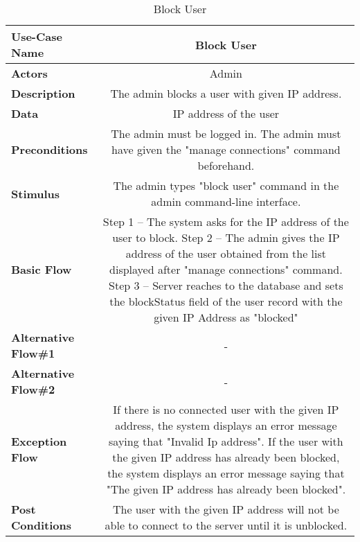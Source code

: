 \begin{table}[H]
     \centering
     \begin{tabular}{|l|C|}
         \hline
          \textbf{Use-Case Name} & Block User \\
         \hline
          \textbf{Actors} & Admin \\ 
         \hline
          \textbf{Description} & The admin blocks a user with given IP address. \\ 
         \hline
          \textbf{Data} & IP address of the user\\ 
         \hline
          \textbf{Preconditions} & 
          The admin must be logged in. \newline
          The admin must have given the "manage connections" command beforehand.\\
         \hline
          \textbf{Stimulus} & The admin types "block user" command in the admin command-line interface.\\ 
         \hline
          \textbf{Basic Flow} & 
          Step 1 -- The system asks for the IP address of the user to block. \newline
          Step 2 -- The admin gives the IP address of the user obtained from the list displayed after "manage connections" command. \newline
          Step 3 -- Server reaches to the database and sets the blockStatus field of the user record with the given IP Address as "blocked" \\
         \hline
          \textbf{Alternative Flow\#1} & -\\
         \hline
          \textbf{Alternative Flow\#2} & - \\
         \hline
          \textbf{Exception Flow} & If there is no connected user with the given IP address, the system displays an error message saying that "Invalid Ip address". If the user with the given IP address  has already been blocked, the system displays an error message saying that "The given IP address has already been blocked".\\
         \hline
          \textbf{Post Conditions} & The user with the given IP address will not be able to connect to the server until it is unblocked.\\ 
         \hline
     \end{tabular}
     \caption{Block User}
     \label{tab:block_user}
 \end{table}
